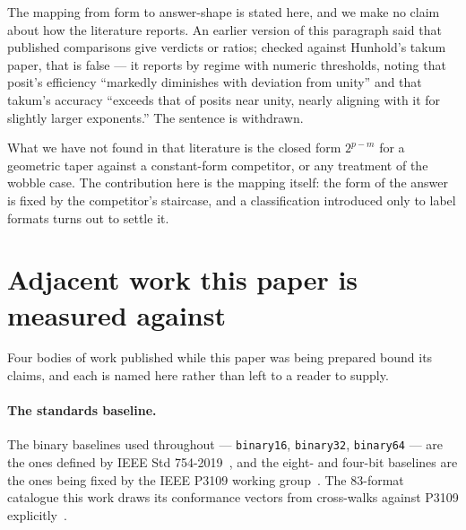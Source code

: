 The mapping from form to answer-shape is stated here, and we make no claim about
how the literature reports. An earlier version of this paragraph said that
published comparisons give verdicts or ratios; checked against Hunhold's takum
paper, that is false --- it reports by regime with numeric thresholds, noting
that posit's efficiency ``markedly diminishes with deviation from unity'' and
that takum's accuracy ``exceeds that of posits near unity, nearly aligning with
it for slightly larger exponents.'' The sentence is withdrawn.

What we have not found in that literature is the closed form $2^{p-m}$ for a
geometric taper against a constant-form competitor, or any treatment of the
wobble case. The contribution here is the mapping itself: the form of the answer
is fixed by the competitor's staircase, and a classification introduced only to
label formats turns out to settle it.




\section{Adjacent work this paper is measured against}\label{sec:adjacent}

Four bodies of work published while this paper was being prepared bound its
claims, and each is named here rather than left to a reader to supply.

\paragraph{The standards baseline.} The binary baselines used throughout ---
\texttt{binary16}, \texttt{binary32}, \texttt{binary64} --- are the ones defined
by IEEE Std 754-2019~\cite{ieee754_2019}, and the eight- and four-bit baselines
are the ones being fixed by the IEEE P3109 working
group~\cite{p3109wg2026}. The 83-format catalogue this work draws its
conformance vectors from cross-walks against P3109 explicitly~\cite{catalogue}.

